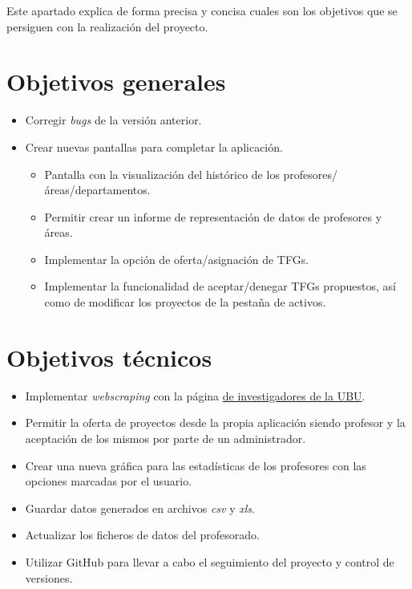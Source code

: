 
Este apartado explica de forma precisa y concisa cuales son los objetivos que se persiguen con la realización del proyecto.

\section{Objetivos generales}
\begin{itemize}
	\item Corregir \emph{bugs} de la versión anterior.
	\item Crear nuevas pantallas para completar la aplicación.
		\begin{itemize}
			\item Pantalla con la visualización del histórico de los profesores/áreas/departamentos.
			\item Permitir crear un informe de representación de datos de profesores y áreas.
			\item Implementar la opción de oferta/asignación de TFGs.
			\item Implementar la funcionalidad de aceptar/denegar TFGs propuestos, así como de modificar los proyectos de la pestaña de activos.
		\end{itemize}

	
\end{itemize}
\section{Objetivos técnicos}
\begin{itemize}
	\item Implementar \emph{webscraping} con la página \href{https://investigacion.ubu.es/unidades/2682/investigadores}{de investigadores de la UBU}.
	\item Permitir la oferta de proyectos desde la propia aplicación siendo profesor y la aceptación de los mismos por parte de un administrador.
	\item Crear una nueva gráfica para las estadísticas de los profesores con las opciones marcadas por el usuario.
	\item Guardar datos generados en archivos \emph{csv} y \emph{xls}.
	\item Actualizar los ficheros de datos del profesorado.
	\item Utilizar GitHub para llevar a cabo el seguimiento del proyecto y control de versiones.
\end{itemize}